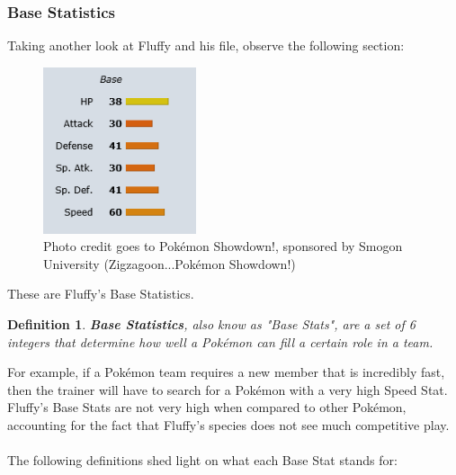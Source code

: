 \documentclass{article}
\newtheorem{definition}{Definition}
\begin{document}
\subsubsection{Base Statistics}
Taking another look at Fluffy and his file, observe the following section:\\
\begin{figure}[H]
	\includegraphics[width=0.4\textwidth]{fluffystats.png}
	\centering
	\caption{Photo credit goes to Pok\'emon Showdown!, sponsored by Smogon University (Zigzagoon...Pok\'emon Showdown!)}
\end{figure}
These are Fluffy's Base Statistics. 
\begin{definition}
	\textbf{Base Statistics}, also know as "Base Stats", are a set of 6 integers that determine how well a Pok\'emon can fill a certain role in a team.
\end{definition}
For example, if a Pok\'emon team requires a new member that is incredibly fast, then the trainer will have to search for a Pok\'emon with a very high Speed Stat. Fluffy's Base Stats are not very high when compared to other Pok\'emon, accounting for the fact that Fluffy's species does not see much competitive play.\\\\
The following definitions shed light on what each Base Stat stands for:
\end{document}
